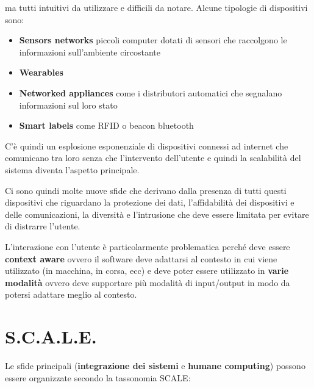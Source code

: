 ma tutti intuitivi da utilizzare e difficili da notare.
Alcune tipologie di dispositivi sono:

\begin{itemize}
\item \textbf{Sensors networks} piccoli computer dotati di sensori che
  raccolgono le informazioni sull'ambiente circostante
\item \textbf{Wearables}
\item \textbf{Networked appliances} come i distributori automatici che
  segnalano informazioni sul loro stato
\item \textbf{Smart labels} come RFID o beacon bluetooth

\end{itemize}

C'è quindi un esplosione esponenziale di dispositivi connessi ad
internet che comunicano tra loro senza che l'intervento dell'utente e
quindi la scalabilità del sistema diventa l'aspetto principale.

Ci sono quindi molte nuove sfide che derivano dalla presenza di tutti
questi dispositivi che riguardano la protezione dei dati, l'affidabilità
dei dispositivi e delle comunicazioni, la diversità e l'intrusione che
deve essere limitata per evitare di distrarre l'utente.

L'interazione con l'utente è particolarmente problematica perché deve
essere \textbf{context aware} ovvero il software deve adattarsi al
contesto in cui viene utilizzato (in macchina, in corsa, ecc) e deve
poter essere utilizzato in \textbf{varie modalità} ovvero deve
supportare più modalità di input/output in modo da potersi adattare
meglio al contesto.

\section{S.C.A.L.E.}
\label{s.c.a.l.e.}

Le sfide principali (\textbf{integrazione dei sistemi} e \textbf{humane
computing}) possono essere organizzate secondo la tassonomia SCALE:

